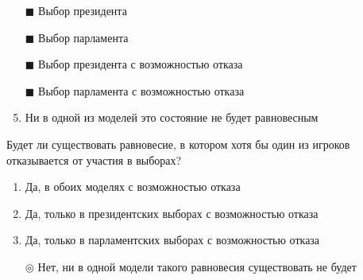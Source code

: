 \begin{enumerate}[label=$\square$]
	
	
	
	\item[$\blacksquare$] Выбор президента %
	\item[$\blacksquare$] Выбор парламента
	\item[$\blacksquare$] Выбор президента с возможностью отказа
	\item[$\blacksquare$] Выбор парламента с возможностью отказа
	\item Ни в одной из моделей это состояние не будет равновесным
\end{enumerate}

\solution %

\task Будет ли существовать равновесие, в котором хотя бы один из игроков отказывается от участия в выборах?
\begin{enumerate}[label=$\circ$] %
	\item Да, в обоих моделях с возможностью отказа
	\item Да, только в президентских выборах с возможностью отказа
	\item Да, только в парламентских выборах с возможностью отказа
	\item[$\circledcirc$] Нет, ни в одной модели такого равновесия существовать не будет
\end{enumerate}

